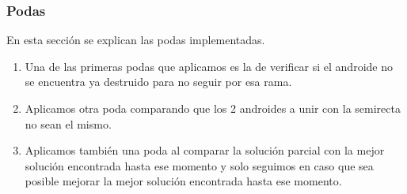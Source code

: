 \subsubsection{Podas}
En esta sección se explican las podas implementadas.

\begin{enumerate}
\item Una de las primeras podas que aplicamos es la de verificar si el androide no se encuentra ya destruido para no seguir por esa rama.
\item Aplicamos otra poda comparando que los 2 androides a unir con la semirecta no sean el mismo.
\item Aplicamos también una poda al comparar la solución parcial con la mejor solución encontrada hasta ese momento y solo seguimos en caso que sea posible mejorar la mejor solución encontrada hasta ese momento.
\end{enumerate}

